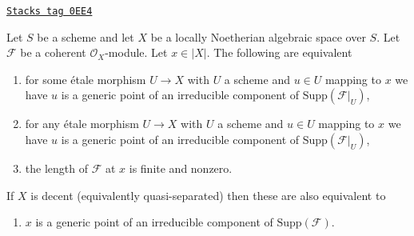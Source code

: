 \begin{lemma}
\label{spaces-chow-lemma-length-finite}
\href{https://stacks.math.columbia.edu/tag/0EE4}{\texttt{Stacks tag 0EE4}}

Let $S$ be a scheme and let $X$ be a
locally Noetherian algebraic space over $S$.
Let $\mathcal{F}$ be a coherent $\mathcal{O}_X$-module.
Let $x \in |X|$. The following are equivalent
\begin{enumerate}
\item for some \'etale morphism $U \to X$ with $U$ a scheme
and $u \in U$ mapping to $x$ we have $u$ is a generic point
of an irreducible component of $\text{Supp}(\mathcal{F}|_U)$,
\item for any \'etale morphism $U \to X$ with $U$ a scheme
and $u \in U$ mapping to $x$ we have $u$ is a generic point
of an irreducible component of $\text{Supp}(\mathcal{F}|_U)$,
\item the length of $\mathcal{F}$ at $x$ is finite and nonzero.
\end{enumerate}
If $X$ is decent (equivalently quasi-separated) then these are
also equivalent to
\begin{enumerate}
\item[(4)] $x$ is a generic point of an irreducible component of
$\text{Supp}(\mathcal{F})$.
\end{enumerate}
\end{lemma}


